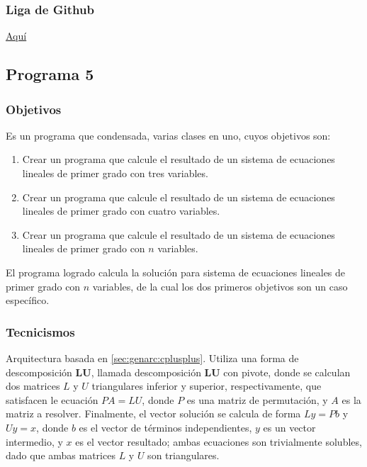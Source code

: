 \documentclass{article}[12pt,a4paper]
\begin{document}
\subsubsection{Liga de \textbf{Github}}

\href{https://github.com/MarcosHCK/master-programming/tree/master/clase4}{Aquí \faGithubSquare}

\subsection{Programa 5}

\subsubsection{Objetivos}

Es un programa que condensada, varias clases en uno, cuyos objetivos son:

\begin{enumerate}
  \item Crear un programa que calcule el resultado de un sistema de ecuaciones lineales de primer grado con tres variables.
  \item Crear un programa que calcule el resultado de un sistema de ecuaciones lineales de primer grado con cuatro variables.
  \item Crear un programa que calcule el resultado de un sistema de ecuaciones lineales de primer grado con \(n\) variables.
\end{enumerate}

El programa logrado calcula la solución para sistema de ecuaciones lineales de primer grado con \(n\) variables, de la cual los dos primeros objetivos son un caso específico.

\subsubsection{Tecnicismos}

Arquitectura basada en \ref{sec:genarc:cplusplus}. Utiliza una forma de descomposición \textbf{LU}, llamada descomposición \textbf{LU} con pivote, donde se calculan dos matrices \(L\) y \(U\) triangulares inferior y superior, respectivamente, que satisfacen le ecuación \(PA=LU\), donde \(P\) es una matriz de permutación, y \(A\) es la matriz a resolver. Finalmente, el vector solución se calcula de forma \(Ly=Pb\) y \(Uy=x\), donde \(b\) es el vector de términos independientes, \(y\) es un vector intermedio, y \(x\) es el vector resultado; ambas ecuaciones son trivialmente solubles, dado que ambas matrices \(L\) y \(U\) son triangulares.
\end{document}
